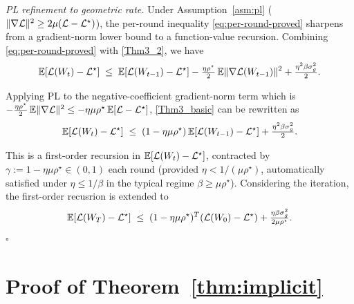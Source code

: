 \emph{PL refinement to geometric rate.} Under Assumption~\ref{asm:pl} ($\|\nabla\mathcal{L}\|^2\ge 2\mu(\mathcal{L}-\mathcal{L}^\star)$), the per-round inequality \eqref{eq:per-round-proved} sharpens from a gradient-norm lower bound to a function-value recursion. Combining \eqref{eq:per-round-proved} with \eqref{Thm3_2}, we have 
\begin{equation} \label{Thm3_basic}
\mathbb{E}[\mathcal{L}(W_t)-\mathcal{L}^\star] \;\le\; \mathbb{E}[\mathcal{L}(W_{t-1})-\mathcal{L}^\star] - \tfrac{\eta\rho^\star}{2}\,\mathbb{E}\|\nabla\mathcal{L}(W_{t-1})\|^2 + \tfrac{\eta^2\beta\sigma_g^2}{2}.
\end{equation}

Applying PL to the negative-coefficient gradient-norm term which is $-\tfrac{\eta\rho^\star}{2}\,\mathbb{E}\|\nabla\mathcal{L}\|^2 \le -\eta\mu\rho^\star\,\mathbb{E}[\mathcal{L} - \mathcal{L}^\star]$, \eqref{Thm3_basic} can be rewritten as
\begin{equation} 
\mathbb{E}[\mathcal{L}(W_t)-\mathcal{L}^\star] \;\le\; (1-\eta\mu\rho^\star)\,\mathbb{E}[\mathcal{L}(W_{t-1})-\mathcal{L}^\star] + \tfrac{\eta^2\beta\sigma_g^2}{2}.
\end{equation}

This is a first-order recursion in $\mathbb{E}[\mathcal{L}(W_t)-\mathcal{L}^\star]$, contracted by $\gamma:=1-\eta\mu\rho^\star \in (0,1)$ each round (provided $\eta < 1/(\mu\rho^\star)$, automatically satisfied under $\eta\le 1/\beta$ in the typical regime $\beta \ge \mu\rho^\star$). Considering the iteration, the first-order recusrion is extended to
\begin{equation} 
\mathbb{E}[\mathcal{L}(W_T)-\mathcal{L}^\star] \;\le\; (1-\eta\mu\rho^\star)^T(\mathcal{L}(W_0)-\mathcal{L}^\star) + \tfrac{\eta\beta\sigma_g^2}{2\mu\rho^\star}.
\end{equation}
\hfill$\square$



\section{Proof of Theorem~\ref{thm:implicit}}
\label{app:proof-implicit}


